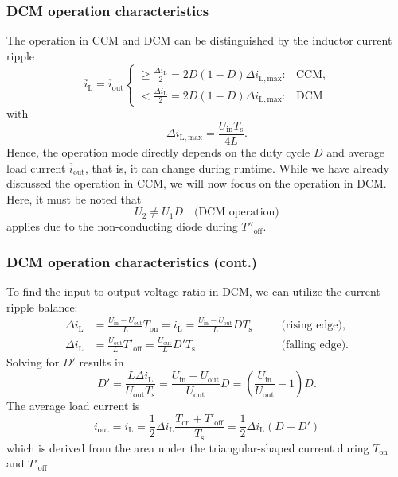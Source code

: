 \begin{frame}
    \frametitle{DCM operation characteristics}
    The operation in CCM and DCM can be distinguished by the inductor current ripple
    \begin{equation}
        \overline{i}_\mathrm{L}=\overline{i}_\mathrm{out}\begin{cases}
            \geq \frac{\Delta i_\mathrm{L}}{2}= 2D(1-D)\Delta i_\mathrm{L,max}: & \text{CCM},\\
            < \frac{\Delta i_\mathrm{L}}{2}= 2D(1-D)\Delta i_\mathrm{L,max}: & \text{DCM}
        \end{cases}
    \end{equation}
    with $$\Delta i_\mathrm{L,max} = \frac{U_\mathrm{in}T_\mathrm{s}}{4L}.$$
    Hence, the operation mode directly depends on the duty cycle $D$ and average load current $\overline{i}_\mathrm{out}$, that is, it can change during runtime. While we have already discussed the operation in CCM, we will now focus on the operation in DCM. Here, it must be noted that
    $$ U_2 \neq U_1 D \quad \mbox{(DCM operation)}$$
    applies due to the non-conducting diode during  $T''_\mathrm{off}$.
\end{frame}

\begin{frame}
    \frametitle{DCM operation characteristics (cont.)}
    To find the input-to-output voltage ratio in DCM, we can utilize the current ripple balance:
    \begin{equation}
        \begin{alignedat}{2}
            \Delta i_\mathrm{L} &= \frac{U_\mathrm{in}-U_\mathrm{out}}{L}T_\mathrm{on} = i_\mathrm{L} = \frac{U_\mathrm{in}-U_\mathrm{out}}{L}DT_\mathrm{s} \quad &&\mbox{(rising edge)},\\
            \Delta i_\mathrm{L} &= \frac{U_\mathrm{out}}{L}T'_\mathrm{off} = \frac{U_\mathrm{out}}{L}D'T_\mathrm{s} \quad &&\mbox{(falling edge)}.
        \end{alignedat}
    \end{equation}
    Solving for $D'$ results in
    \begin{equation}
        D' = \frac{L\Delta i_\mathrm{L}}{U_\mathrm{out}T_\mathrm{s}} = \frac{U_\mathrm{in}-U_\mathrm{out}}{U_\mathrm{out}}D = \left(\frac{U_\mathrm{in}}{U_\mathrm{out}}-1\right)D.
        \label{eq:Dprime-DCM}
    \end{equation}
    The average load current is
    \begin{equation}
        \overline{i}_\mathrm{out} = \overline{i}_\mathrm{L} = \frac{1}{2}\Delta i_\mathrm{L}\frac{T_\mathrm{on}+T'_\mathrm{off}}{T_\mathrm{s}} = \frac{1}{2}\Delta i_\mathrm{L}(D+D')
        \label{eq:average-load-current-DCM}
    \end{equation}
    which is derived from the area under the triangular-shaped current during $T_\mathrm{on}$ and $T'_\mathrm{off}$. 
\end{frame}

